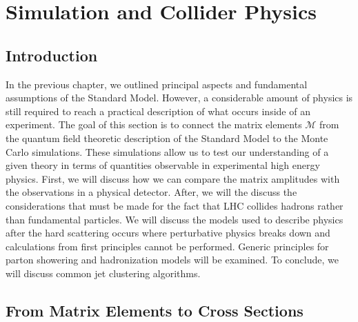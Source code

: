 \chapter{Simulation and Collider Physics \label{ch:collider}}

\section{Introduction}

In the previous chapter, we outlined principal aspects and fundamental assumptions of the Standard Model. 
However, a considerable amount of physics is still required to reach a practical
 description of what occurs inside of an  experiment. The goal of this section is
 to connect the matrix elements $\mathcal{M}$ from the quantum field
theoretic description  of the Standard Model to the Monte Carlo simulations. These simulations allow us to test
 our understanding of a given theory in terms of quantities observable in experimental high energy physics. 
First, we will discuss how
we can compare the matrix amplitudes with the observations in a physical detector. 
After, we will the discuss the considerations that must be made for the fact that
 LHC collides hadrons rather than fundamental particles. We will discuss the
 models used to describe physics after the
 hard scattering occurs where perturbative physics breaks down and  calculations from first
principles cannot be performed. Generic principles for parton showering and hadronization
 models will be examined. To conclude, we will discuss common jet clustering algorithms. 

\section{From Matrix Elements to Cross Sections} 

